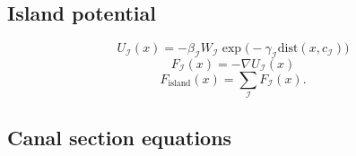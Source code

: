 \documentclass[11pt,a4paper]{article}
\begin{document}
\subsection{Island potential}

\begin{equation}
U_{\mathcal{I}}(x)=
-\beta_{\mathcal{I}}W_{\mathcal{I}}
\exp\bigl(-\gamma_{\mathcal{I}}\mathrm{dist}(x,c_{\mathcal{I}})\bigr)
\label{eq:island_potential}
\end{equation}
\begin{equation}
F_{\mathcal{I}}(x)=-\nabla U_{\mathcal{I}}(x)
\label{eq:island_force}
\end{equation}
\begin{equation}
F_{\mathrm{island}}(x)=\sum_{\mathcal{I}}F_{\mathcal{I}}(x).
\label{eq:total_island_force}
\end{equation}

\subsection{Canal section equations}
\end{document}

